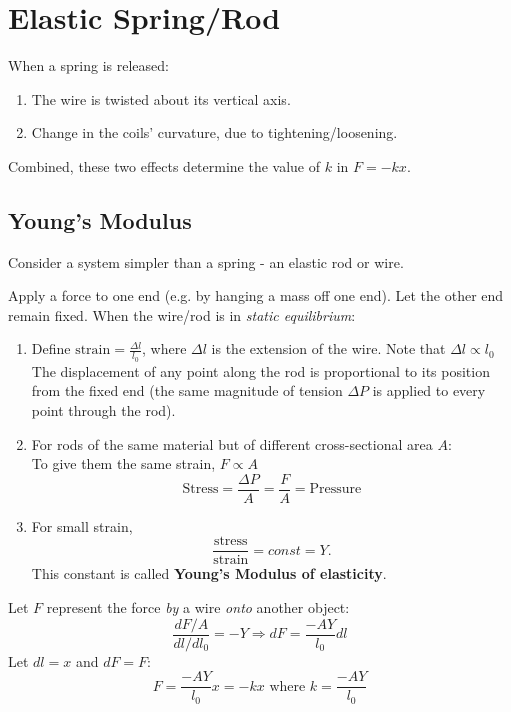 \documentclass[11pt,letterpaper,titlepage,oneside]{book}
\begin{document}
\section{Elastic Spring/Rod}
When a spring is released:
\begin{enumerate}
\item The wire is twisted about its vertical axis.
\item Change in the coils' curvature, due to tightening/loosening.
\end{enumerate}
Combined, these two effects determine the value of $k$ in $F=-kx$.

\subsection{Young's Modulus}
Consider a system simpler than a spring - an elastic rod or wire.

Apply a force to one end (e.g. by hanging a mass off one end). Let the other end remain fixed. When the wire/rod is in \textit{static equilibrium}:
\begin{enumerate}
\item Define $\boxed{\text{strain} = \frac{\Delta l}{l_0}}$, where $\Delta l$ is the extension of the wire. Note that $\Delta l \propto l_0$
The displacement of any point along the rod is proportional to its position from the fixed end (the same magnitude of tension $\Delta P$ is applied to every point through the rod).

\item For rods of the same material but of different cross-sectional area $A$: \\
To give them the same strain, $F \propto A$
\[\boxed{ \text{Stress} = \frac{\Delta P}{A} = \frac{F}{A} = \text{Pressure} } \]

\item For small strain, \[\boxed{ \frac{\text{stress}}{\text{strain}}=const=Y }.\]
This constant is called \textbf{Young's Modulus of elasticity}.
\end{enumerate}

Let $F$ represent the force \textit{by} a wire \textit{onto} another object:
\begin{equation} \frac{dF/A}{dl/dl_0} = -Y \Longrightarrow dF = \frac{-AY}{l_0}dl \label{youngs_dF} \end{equation}
Let $dl = x$ and $dF=F$: \begin{equation} \boxed{F=\frac{-AY}{l_0}x=-kx} \text{ where } k=\frac{-AY}{l_0} \label{youngs_F} \end{equation}
\end{document}
